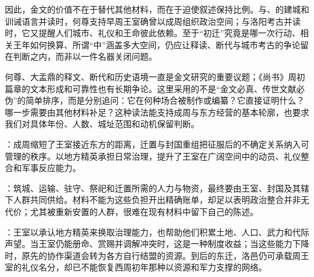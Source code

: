 因此，金文的价值不在于替代其他材料，而在于迫使叙述保持比例。与、的建城和训诫语言并读时，何尊支持早周王室确曾以成周组织政治空间；与洛阳考古并读时，它又提醒人们城市、礼仪和王命彼此依赖。至于“初迁”究竟是哪一次行动、相关王年如何换算、所谓“中”涵盖多大空间，仍应让释读、断代与城市考古的争论留在判断之内，而非以一件名器关闭问题。

\begin{sourcenote}
何尊、大盂鼎的释文、断代和历史语境一直是金文研究的重要议题；《尚书》周初篇章的文本形成和可靠性也有长期争论。这里采用的不是“金文必真、传世文献必伪”的简单排序，而是分别追问：它在何种场合被制作或编纂？它直接证明什么？哪一步需要由其他材料补足？这种读法能支持成周与东方经营的基本轮廓，也要求我们对具体年份、人数、城址范围和动机保留判断。
\end{sourcenote}

\begin{turningpoint}
：成周缩短了王室接近东方的距离，迁置与封国重组把征服后的不确定关系纳入可管理的秩序。以地方精英承担日常治理，提升了王室在广阔空间中的动员、礼仪整合和军事反应能力。

：筑城、运输、驻守、祭祀和迁置所需的人力与物资，最终要由王室、封国及其辖下人群共同供给。材料不能为这些负担开出精确账单，却足以表明政治整合并非无代价；尤其被重新安置的人群，很难在现有材料中留下自己的陈述。

：王室以承认地方精英来换取治理能力，也帮助他们积累土地、人口、武力和代际声望。当王室仍能册命、赏赐并调解冲突时，这是一种制度收益；当这些能力下降时，原先的协作渠道会转为各方自行结盟的资源。到后的东迁，洛邑仍可承载周王室的礼仪名分，却已不能恢复西周初年那种以资源和军力支撑的网络。
\end{turningpoint}
